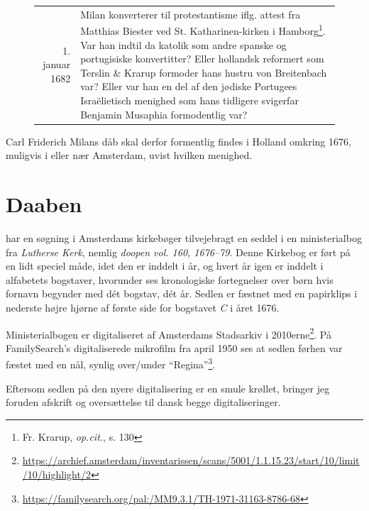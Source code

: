\documentclass[
	a4paper,
	12pt,
	final
]{memoir}
\begin{document}
\begin{savenotes}
\begin{figure}[H]
\begin{tabular}{r p{}}
	1. januar 1682 & Milan konverterer til protestantisme iflg. attest fra Matthias Biester ved St. Katharinen-kirken i Hamborg\footnote{Fr. Krarup, \emph{op.cit.}, s. 130}. Var han indtil da katolik som andre spanske og portugisiske konvertitter? Eller hollandsk reformert som Terslin \& Krarup formoder hans hustru von Breitenbach var? Eller var han en del af den jødiske Portugees Israëlietisch menighed som hans tidligere svigerfar Benjamin Musaphia formodentlig var? \\
\end{tabular}%
\end{figure}%
\end{savenotes}

Carl Friderich Milans dåb skal derfor formentlig findes i Holland omkring 1676, muligvis i eller nær Amsterdam, uvist hvilken menighed.

\clearpage%
\section{Daaben}

 har en søgning i Amsterdams kirkebøger tilvejebragt en seddel i en ministerialbog fra \emph{Lutherse Kerk}, nemlig \emph{doopen vol. 160, 1676--79}. Denne Kirkebog er ført på en lidt speciel måde, idet den er inddelt i år, og hvert år igen er inddelt i alfabetets bogstaver, hvorunder ses kronologiske fortegnelser over børn hvis fornavn begynder med dét bogstav, dét år. Sedlen er fæstnet med en papirklips i nederste højre hjørne af første side for bogstavet \emph{C} i året 1676.

Ministerialbogen er digitaliseret af Amsterdams Stadsarkiv i 2010erne\footnote{\smaller\url{https://archief.amsterdam/inventarissen/scans/5001/1.1.15.23/start/10/limit/10/highlight/2}%
}. På FamilySearch's digitaliserede mikrofilm fra april 1950 ses at sedlen førhen var fæstet med en nål, synlig over/under \enquote{Regina}\footnote{\smaller\url{https://familysearch.org/pal:/MM9.3.1/TH-1971-31163-8786-68}}.

Eftersom sedlen på den nyere digitalisering er en smule krøllet, bringer jeg foruden afskrift og oversættelse til dansk begge digitaliseringer.
\end{document}
